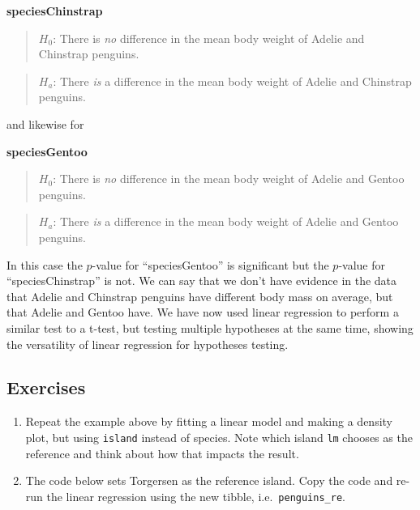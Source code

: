 \documentclass[
  letterpaper,
  DIV=11,
  numbers=noendperiod]{scrreprt}
\providecommand{\tightlist}{%
  \setlength{\itemsep}{0pt}\setlength{\parskip}{0pt}}\usepackage{longtable,booktabs,array}
\begin{document}
\textbf{speciesChinstrap}

\begin{quote}
\textbf{\(H_0\)}: There is \emph{no} difference in the mean body weight
of Adelie and Chinstrap penguins.
\end{quote}

\begin{quote}
\textbf{\(H_a\)}: There \emph{is} a difference in the mean body weight
of Adelie and Chinstrap penguins.
\end{quote}

and likewise for

\textbf{speciesGentoo}

\begin{quote}
\textbf{\(H_0\)}: There is \emph{no} difference in the mean body weight
of Adelie and Gentoo penguins.
\end{quote}

\begin{quote}
\textbf{\(H_a\)}: There \emph{is} a difference in the mean body weight
of Adelie and Gentoo penguins.
\end{quote}

In this case the \(p\)-value for ``speciesGentoo'' is significant but
the \(p\)-value for ``speciesChinstrap'' is not. We can say that we
don't have evidence in the data that Adelie and Chinstrap penguins have
different body mass on average, but that Adelie and Gentoo have. We have
now used linear regression to perform a similar test to a t-test, but
testing multiple hypotheses at the same time, showing the versatility of
linear regression for hypotheses testing.

\subsection{Exercises}\label{exercises-13}

\begin{enumerate}
\def\labelenumi{\arabic{enumi}.}
\tightlist
\item
  Repeat the example above by fitting a linear model and making a
  density plot, but using \texttt{island} instead of species. Note which
  island \texttt{lm} chooses as the reference and think about how that
  impacts the result.
\item
  The code below sets Torgersen as the reference island. Copy the code
  and re-run the linear regression using the new tibble,
  i.e.~\texttt{penguins\_re}.
\end{enumerate}
\end{document}
